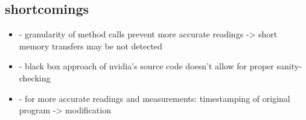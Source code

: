 \subsection{shortcomings}
\begin{itemize}
	\item - granularity of method calls prevent more accurate readings -> short memory transfers may be not detected
	\item - black box approach of nvidia's source code doesn't allow for proper sanity-checking
	\item - for more accurate readings and measurements: timestamping of original program -> modification
\end{itemize}
